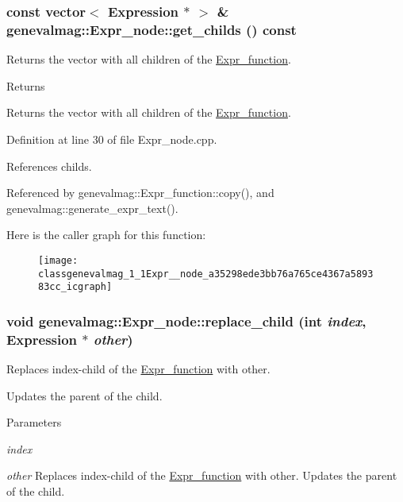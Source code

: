 \hypertarget{classgenevalmag_1_1Expr__node_a35298ede3bb76a765ce4367a589383cc}{
\subsubsection[{get\_\-childs}]{\setlength{\rightskip}{0pt plus 5cm}const vector$<$ {\bf Expression} $\ast$ $>$ \& genevalmag::Expr\_\-node::get\_\-childs () const}}
\label{classgenevalmag_1_1Expr__node_a35298ede3bb76a765ce4367a589383cc}
Returns the vector with all children of the \hyperlink{classgenevalmag_1_1Expr__function}{Expr\_\-function}. \begin{DoxyReturn}{Returns}

\end{DoxyReturn}
Returns the vector with all children of the \hyperlink{classgenevalmag_1_1Expr__function}{Expr\_\-function}. 

Definition at line 30 of file Expr\_\-node.cpp.



References childs.



Referenced by genevalmag::Expr\_\-function::copy(), and genevalmag::generate\_\-expr\_\-text().



Here is the caller graph for this function:\nopagebreak
\begin{figure}[H]
\begin{center}
\leavevmode
\texttt{[image: classgenevalmag\_1\_1Expr\_\_node\_a35298ede3bb76a765ce4367a589383cc\_icgraph]}
\end{center}
\end{figure}


\hypertarget{classgenevalmag_1_1Expr__node_a951f8db517c231456781d10961ef8dba}{
\subsubsection[{replace\_\-child}]{\setlength{\rightskip}{0pt plus 5cm}void genevalmag::Expr\_\-node::replace\_\-child (int {\em index}, \/  {\bf Expression} $\ast$ {\em other})}}
\label{classgenevalmag_1_1Expr__node_a951f8db517c231456781d10961ef8dba}
Replaces index-\/child of the \hyperlink{classgenevalmag_1_1Expr__function}{Expr\_\-function} with other.\par
 Updates the parent of the child. 
\begin{DoxyParams}{Parameters}
\item[{\em index}]\item[{\em other}]Replaces index-\/child of the \hyperlink{classgenevalmag_1_1Expr__function}{Expr\_\-function} with other. Updates the parent of the child. \end{DoxyParams}


